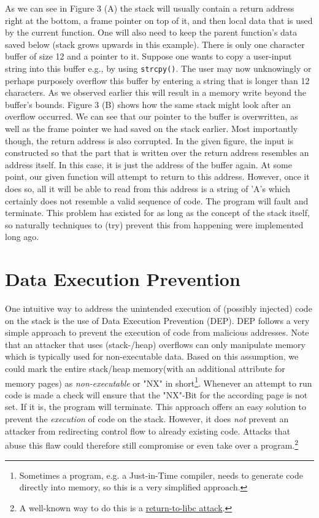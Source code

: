 \documentclass[10pt,twocolumn,a4paper]{article}
\begin{document}
\newline
As we can see in Figure 3 (A) the stack will usually contain a return address right at the bottom, a frame pointer on top of it, and then local data that is used by the current function.
One will also need to keep the parent function's data saved below (stack grows upwards in this example).
There is only one character buffer of size 12 and a pointer to it.
Suppose one wants to copy a user-input string into this buffer e.g., by using \texttt{strcpy()}.
The user may now unknowingly or perhaps purposely overflow this buffer by entering a string that is longer than 12 characters.
As we observed earlier this will result in a memory write beyond the buffer's bounds. 
Figure 3 (B) shows how the same stack might look after an overflow occurred. We can see that our pointer to the buffer is overwritten, as well as the frame pointer we had saved on the stack earlier.
Most importantly though, the return address is also corrupted.
In the given figure, the input is constructed so that the part that is written over the return address resembles an address itself.
In this case, it is just the address of the buffer again.
At some point, our given function will attempt to return to this address.
However, once it does so, all it will be able to read from this address is a string of 'A's which certainly does not resemble a valid sequence of code.
The program will fault and terminate.
This problem has existed for as long as the concept of the stack itself, so naturally techniques to (try) prevent this from happening were implemented long ago.

\section{Data Execution Prevention}\label{sec:DEP}
One intuitive way to address the unintended execution of (possibly injected) code on the stack is the use of Data Execution Prevention (DEP).
DEP follows a very simple approach to prevent the execution of code from malicious addresses.
Note that an attacker that uses (stack-/heap) overflows can only manipulate memory which is typically used for non-executable data. %
Based on this assumption, we could mark the entire stack/heap memory(with an additional attribute for memory pages) as \emph{non-executable} or "NX" in short\footnote{Sometimes a program, e.g. a Just-in-Time compiler, needs to generate code directly into memory, so this is a very simplified approach.}.
Whenever an attempt to run code is made a check will ensure that the "NX"-Bit for the according page is not set. If it is, the program will terminate\cite{DEP}.
This approach offers an easy solution to prevent the \emph{execution} of code on the stack.
However, it does \emph{not} prevent an attacker from redirecting control flow to already existing code. Attacks that abuse this flaw could therefore still compromise or even take over a program.\footnote{A well-known way to do this is a \hyperref{https://en.wikipedia.org/wiki/Return-to-libc_attack}{Return-to-Libc Exploits}{name}{return-to-libc attack}.}
\end{document}

